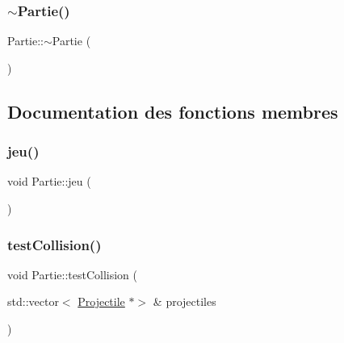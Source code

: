 \mbox{\label{class_partie_ae4afeb7336bb84427272cfb7018b5e3d}} 
\subsubsection{\texorpdfstring{$\sim$\+Partie()}{~Partie()}}
{\footnotesize\ttfamily Partie\+::$\sim$\+Partie (\begin{DoxyParamCaption}{ }\end{DoxyParamCaption})}



\subsection{Documentation des fonctions membres}
\mbox{\label{class_partie_a38d54358098b3e5e47d0059a37bff5ea}} 
\subsubsection{\texorpdfstring{jeu()}{jeu()}}
{\footnotesize\ttfamily void Partie\+::jeu (\begin{DoxyParamCaption}{ }\end{DoxyParamCaption})}

\mbox{\label{class_partie_aae0457a6d531a2c2da83463a7fa66574}} 
\subsubsection{\texorpdfstring{test\+Collision()}{testCollision()}}
{\footnotesize\ttfamily void Partie\+::test\+Collision (\begin{DoxyParamCaption}\item[{std\+::vector$<$ \hyperlink{class_projectile}{Projectile} $\ast$$>$ \&}]{projectiles }\end{DoxyParamCaption})}

\mbox{\label{class_partie_a6f27ab32773454f2d44a1cf3ef95ba47}} 

